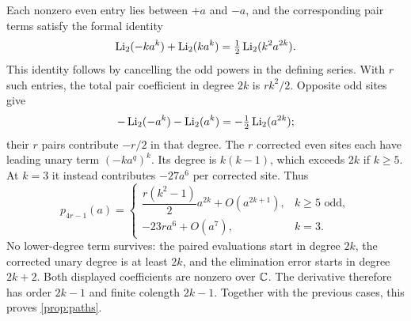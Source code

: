 Each nonzero even entry lies between $+a$ and $-a$, and the corresponding
pair terms satisfy the formal identity
\begin{equation}\label{eq:dilogeven}
 \operatorname{Li}_2(-ka^k)+\operatorname{Li}_2(ka^k)
   =\tfrac12\operatorname{Li}_2(k^2a^{2k}).
\end{equation}
This identity follows by cancelling the odd powers in the defining series.
With $r$ such entries, the total pair coefficient in degree $2k$ is
$rk^2/2$. Opposite odd sites give
\[
 -\operatorname{Li}_2(-a^k)-\operatorname{Li}_2(a^k)=-\tfrac12\operatorname{Li}_2(a^{2k});
\]
their $r$ pairs contribute $-r/2$ in that degree. The $r$ corrected even
sites each have leading unary term $(-ka^q)^k$. Its degree is $k(k-1)$,
which exceeds $2k$ if $k\geq5$. At $k=3$ it instead contributes
$-27a^6$ per corrected site. Thus
\begin{equation}\label{eq:pathcoefficient}
 p_{4r-1}(a)=
 \begin{cases}
  \dfrac{r(k^2-1)}2 a^{2k}+O(a^{2k+1}),&k\geq5\text{ odd},\\[4pt]
  -23r a^6+O(a^7),&k=3.
 \end{cases}
\end{equation}
No lower-degree term survives: the paired evaluations start in degree
$2k$, the corrected unary degree is at least $2k$, and the elimination
error starts in degree $2k+2$. Both displayed coefficients are nonzero
over $\mathbb C$. The derivative therefore has order $2k-1$ and finite
colength $2k-1$. Together with the previous cases, this proves
\cref{prop:paths}.
